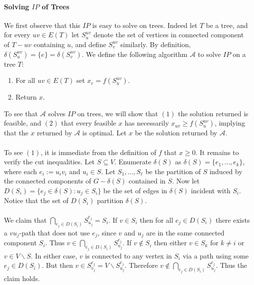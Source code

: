 \documentclass[letterpaper,12pt,oneside,onecolumn]{article}
\newcommand{\cA}{\mathcal{A}} \newcommand{\cB}{\mathcal{B}}
\begin{document}
\paragraph{Solving $IP$ of Trees}
We first observe that this $IP$ is easy to solve on trees. Indeed let $T$ be a tree, and for every $uv \in E(T)$ let $S^{uv}_u$ denote the set of vertices in connected component of $T-uv$ containing $u$, and define $S^{uv}_v$ similarly. By definition, $\delta(S^{uv}_u) =  \{e\} = \delta(S^{uv}_v)$. We define the following algorithm $\cA$ to solve $IP$ on a tree $T$:
\begin{enumerate}
\item For all $uv \in E(T)$ set $x_e = f(S^{uv}_u)$.
\item Return $x$.
\end{enumerate}
To see that $\cA$ solves $IP$ on trees, we will show that $(1)$ the solution returned is feasible, and $(2)$ that every feasible $x$ has necessarily $x_{uv} \geq f(S^{uv}_u)$, implying that the $x$ returned by $\cA$ is optimal.  Let $x$ be the solution returned by $\cA$. 
\paragraph{}
To see $(1)$, it is immediate from the definition of $f$ that $x \geq 0$. It remains to verify the cut inequalities. Let $S \subseteq V$. Enumerate $\delta(S)$ as $\delta(S) = \{e_1, \dots, e_k \}$, where each $e_i := u_iv_i$ and $u_i \in S$. Let $S_1, \dots, S_\ell$ be the partition of $S$ induced by the connected components of $G-\delta(S)$ contained in $S$.  Now let $D(S_i) = \{ e_j \in \delta(S) : u_j \in S_i \}$ be the set of edges in $\delta(S)$ incident with $S_i$. Notice that the set of $D(S_i)$ partition $\delta(S)$. 
\paragraph{}
We claim that $\bigcap_{e_j \in D(S_i)} S^{e_j}_{u_j} = S_i.$ If $v \in S_i$ then for all $e_j \in D(S_i)$ there exists a $vu_j$-path that does not use $e_j$, since $v$ and $u_j$ are in the same connected component $S_i$. Thus $v \in \bigcap_{e_j \in D(S_i)}S^{e_j}_{u_j}$. If $v \not\in S_i$ then either $v \in S_{k}$ for $k \neq i$ or $v \in V\backslash S$. In either case, $v$ is connected to any vertex in $S_i$ via a path using some $e_j \in D(S_i)$. But then $v \in S^{e_j}_{v_j} = V \backslash S^{e_j}_{u_j}$. Therefore $v \not\in \bigcap_{e_j \in D(S_i)}S^{e_j}_{u_j}$. Thus the claim holds.
\end{document}
